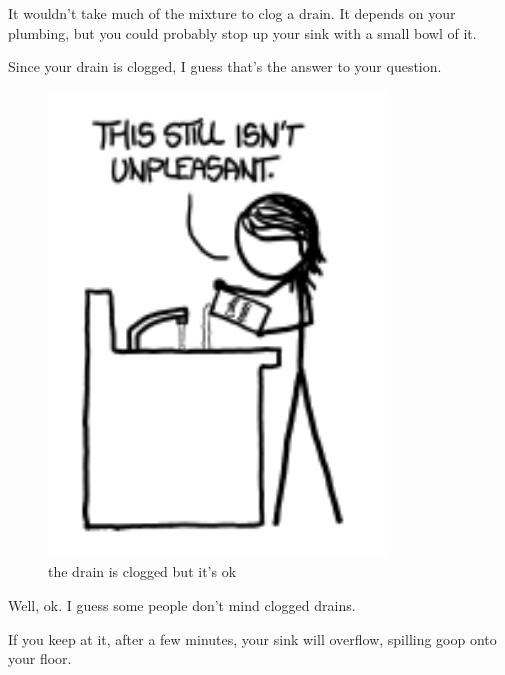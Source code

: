 {It wouldn’t take much of the mixture to clog a drain. It depends on your plumbing, but you could probably stop up your sink with a small bowl of it.}

{Since your drain is clogged, I guess that’s the answer to your question.}

\begin{figure}[!htbp]
\centering
\includegraphics[scale=0.5, max width=0.8\textwidth]{imgs/a/36/cornstarch_clogged.png}
\caption{the drain is clogged but it's ok}
\end{figure}

{Well, ok. I guess some people don’t mind clogged drains.}

{If you keep at it, after a few minutes, your sink will overflow, spilling goop onto your floor.}


